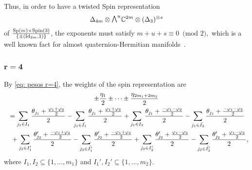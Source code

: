 \documentclass[10pt,a4paper]{amsart}
\newcommand{\ext}{\raise1pt\hbox{$\textstyle\bigwedge$}}
\numberwithin{equation}{section}
\begin{document}
Thus, in order to have a twisted Spin representation
\begin{gather*}\Delta_{4m}\otimes \ext^u \mathbb{C}^{2m}\otimes (\Delta_3)^{\otimes s}\end{gather*}
of ${{\rm Sp}(m)\times {\rm Spin}(3)\over \{\pm ({\rm Id}_{2m},1)\}}$, the exponents must satisfy $m+u+s\equiv 0 \,\,\,\mbox{(mod 2)},$ which is a well known fact for almost quaternion-Hermitian manifolds~\cite{SalPitman}.

\subsubsection[$r=4$]{$\boldsymbol{r=4}$}

By \eqref{eq: pesos r=4}, the weights of the spin representation are
\begin{gather*}
 \pm {\eta_1\over 2} \pm \cdots \pm {\eta_{2m_1+2m_2}\over 2}\\
{}= \sum_{j_1\in I_1} {\theta_{j_1}+{\varphi_1+\varphi_2\over 2}\over 2} - \sum_{j_1\in \bar{I_1}} {\theta_{j_1}+{\varphi_1+\varphi_2\over 2}\over 2}
+ \sum_{j_1\in I_2} {\theta_{j_1}+{-\varphi_1-\varphi_2\over 2}\over 2} - \sum_{j_1\in \bar{I_2}} {\theta_{j_1}+{-\varphi_1-\varphi_2\over 2}\over 2} \\
\quad{} + \sum_{j_2\in I_1'} {\theta_{j_2}'+{-\varphi_1+\varphi_2\over 2}\over 2} - \sum_{j_2\in \bar{I_1'}} {\theta_{j_2}'+{-\varphi_1+\varphi_2\over 2}\over 2}
 + \sum_{j_2\in I_2'} {\theta_{j_2}'+{\varphi_1-\varphi_2\over 2}\over 2} - \sum_{j_2\in \bar{I_2'}} {\theta_{j_2}'+{\varphi_1-\varphi_2\over 2}\over 2} ,
\end{gather*}
where $I_1,I_2\subseteq \{1,\dots,m_1\}$ and $I_1',I_2'\subseteq \{1,\dots,m_2\}$.
\end{document}
